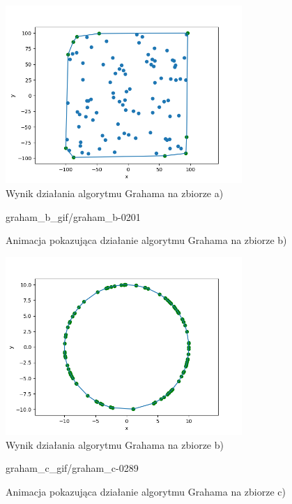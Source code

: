 \documentclass[a4paper]{article}
\begin{document}
\begin{figure}[H]
    \centering
    \includegraphics[width=0.8\textwidth]{graham/graham_a_png.png}
    \caption{Wynik działania algorytmu Grahama na zbiorze a)}
    \label{fig:graham_a}
\end{figure}

\begin{figure}[H]
    {graham_b_gif/graham_b-}{0}{201}
    \centering
    \caption{Animacja pokazująca działanie algorytmu Grahama na zbiorze b)}
    \label{fig:anim_graham_b}
\end{figure}

\begin{figure}[H]
    \centering
    \includegraphics[width=0.8\textwidth]{graham/graham_b_png.png}
    \caption{Wynik działania algorytmu Grahama na zbiorze b)}
    \label{fig:graham_b}
\end{figure}

\begin{figure}[H]
    {graham_c_gif/graham_c-}{0}{289}
    \centering
    \caption{Animacja pokazująca działanie algorytmu Grahama na zbiorze c)}
    \label{fig:anim_graham_c}
\end{figure}
\end{document}
